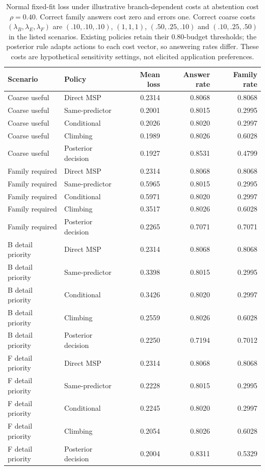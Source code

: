 \begin{table}[htbp]
\centering\footnotesize
\setlength{\tabcolsep}{2.3pt}
\caption{Normal fixed-fit loss under illustrative branch-dependent costs at abstention cost $\rho=0.40$. Correct family answers cost zero and errors one. Correct coarse costs $(\lambda_B,\lambda_E,\lambda_F)$ are $(.10,.10,.10)$, $(1,1,1)$, $(.50,.25,.10)$ and $(.10,.25,.50)$ in the listed scenarios. Existing policies retain their 0.80-budget thresholds; the posterior rule adapts actions to each cost vector, so answering rates differ. These costs are hypothetical sensitivity settings, not elicited application preferences.}\label{tab:supp-branch-utility}
\begin{tabular}{llrrr}
\toprule
Scenario & Policy & Mean loss & Answer rate & Family rate \\
\midrule
Coarse useful & Direct MSP & 0.2314 & 0.8068 & 0.8068 \\
Coarse useful & Same-predictor & 0.2001 & 0.8015 & 0.2995 \\
Coarse useful & Conditional & 0.2026 & 0.8020 & 0.2997 \\
Coarse useful & Climbing & 0.1989 & 0.8026 & 0.6028 \\
Coarse useful & Posterior decision & 0.1927 & 0.8531 & 0.4799 \\
Family required & Direct MSP & 0.2314 & 0.8068 & 0.8068 \\
Family required & Same-predictor & 0.5965 & 0.8015 & 0.2995 \\
Family required & Conditional & 0.5971 & 0.8020 & 0.2997 \\
Family required & Climbing & 0.3517 & 0.8026 & 0.6028 \\
Family required & Posterior decision & 0.2265 & 0.7071 & 0.7071 \\
B detail priority & Direct MSP & 0.2314 & 0.8068 & 0.8068 \\
B detail priority & Same-predictor & 0.3398 & 0.8015 & 0.2995 \\
B detail priority & Conditional & 0.3426 & 0.8020 & 0.2997 \\
B detail priority & Climbing & 0.2559 & 0.8026 & 0.6028 \\
B detail priority & Posterior decision & 0.2250 & 0.7194 & 0.7012 \\
F detail priority & Direct MSP & 0.2314 & 0.8068 & 0.8068 \\
F detail priority & Same-predictor & 0.2228 & 0.8015 & 0.2995 \\
F detail priority & Conditional & 0.2245 & 0.8020 & 0.2997 \\
F detail priority & Climbing & 0.2054 & 0.8026 & 0.6028 \\
F detail priority & Posterior decision & 0.2004 & 0.8311 & 0.5329 \\
\bottomrule
\end{tabular}
\end{table}
